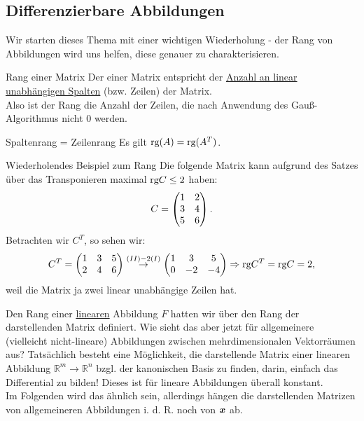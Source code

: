 \subsection{Differenzierbare Abbildungen}
Wir starten dieses Thema mit einer wichtigen Wiederholung - der Rang von Abbildungen wird uns helfen, diese genauer zu charakterisieren.
\begin{Wiederholung}
{Rang einer Matrix}
Der  einer Matrix entspricht der \underline{Anzahl an linear unabhängigen Spalten} (bzw. Zeilen) der Matrix.\\
Also ist der Rang die Anzahl der Zeilen, die nach Anwendung des Gauß-Algorithmus nicht 0 werden.
\end{Wiederholung}
\begin{Wiederholung}
{Spaltenrang = Zeilenrang}
Es gilt $\text{rg}(A)=\text{rg}(A^T)$.
\end{Wiederholung}
\begin{Beispiel}
{Wiederholendes Beispiel zum Rang}
Die folgende Matrix kann aufgrund des Satzes über das Transponieren maximal $\text{rg} C\leq 2$ haben:
\begin{equation*}
    C=\begin{pmatrix}1&2\\3&4\\5&6\end{pmatrix}.
\end{equation*}
Betrachten wir $C^T$, so sehen wir:
\begin{equation*}
    C^T=\begin{pmatrix}1&3&5\\2&4&6\end{pmatrix}\overset{(II)-2(I)}{\to}\begin{pmatrix}1&3&5\\0&-2&-4\end{pmatrix}\Rightarrow\text{rg} C^T=\text{rg} C=2,
\end{equation*}
weil die Matrix ja zwei linear unabhängige Zeilen hat.
\end{Beispiel}
Den Rang einer \underline{linearen} Abbildung $F$ hatten wir über den Rang der darstellenden Matrix definiert. Wie sieht das aber jetzt für allgemeinere (vielleicht nicht-lineare) Abbildungen zwischen mehrdimensionalen Vektorräumen aus? Tatsächlich besteht eine Möglichkeit, die darstellende Matrix einer linearen Abbildung $\mathbb{R}^m\to\mathbb{R}^n$ bzgl. der kanonischen Basis zu finden, darin, einfach das Differential zu bilden! Dieses ist für lineare Abbildungen überall konstant.\\
Im Folgenden wird das ähnlich sein, allerdings hängen die darstellenden Matrizen von allgemeineren Abbildungen i. d. R. noch von ${{\text{\boldmath${x}$}}}$ ab.\\
